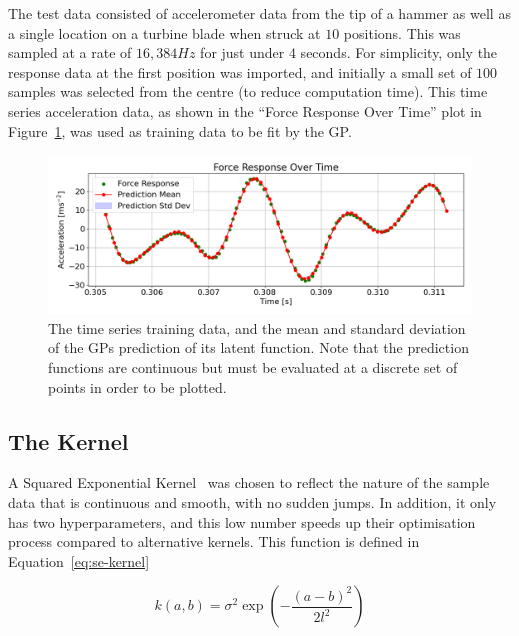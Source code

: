 \documentclass[12pt]{article}
\begin{document}
    The test data consisted of accelerometer data from the tip of a hammer as well as a single location on a turbine blade when struck at $10$ positions.
    This was sampled at a rate of $16,384 Hz$ for just under $4$ seconds.
    For simplicity, only the response data at the first position was imported, and initially a small set of $100$ samples was selected from the centre (to reduce computation time).
    This time series acceleration data, as shown in the ``Force Response Over Time'' plot in Figure~\ref{fig:input-response-plot}, was used as training data to be fit by the GP\@.

    \begin{figure}[ht]
        \centering
        \includegraphics[width=1.0\linewidth]{figures/input-response-plot/input-response-plot.png}
        \caption{The time series training data, and the mean and standard deviation of the GPs prediction of its latent function. Note that the prediction functions are continuous but must be evaluated at a discrete set of points in order to be plotted.}
        \label{fig:input-response-plot}
    \end{figure}



    \subsection{The Kernel}
    A Squared Exponential Kernel~\cite{duvenaud2014kernel} was chosen to reflect the nature of the sample data that is continuous and smooth, with no sudden jumps.
    In addition, it only has two hyperparameters, and this low number speeds up their optimisation process compared to alternative kernels.
    This function is defined in Equation~\ref{eq:se-kernel}

    \begin{equation}
        k(a,b) = \sigma^2 \exp\left(-\frac{(a - b)^2}{2l^2}\right) \label{eq:se-kernel}
    \end{equation}
\end{document}
